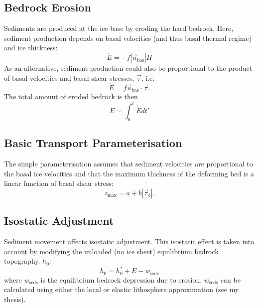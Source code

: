 \subsection{Bedrock Erosion}\label{erosion.sec.hb}
Sediments are produced at the ice base by eroding the hard bedrock. Here, sediment production depends on basal velocities (and thus basal thermal regime) and ice thickness:
\begin{equation}
  \dot{E} = -f|\vec{u}_{\text{bas}}|H
\end{equation}
As an alternative, sediment production could also be proportional to the product of basal velocities and basal shear stresses, $\vec{\tau}$, i.e.
\begin{equation}
  \dot{E} = f\vec{u}_{\text{bas}}\cdot\vec{\tau}.
\end{equation}
The total amount of eroded bedrock is then
\begin{equation}
  E=\int_{0}^t\dot{E}dt'
\end{equation}

\subsection{Basic Transport Parameterisation}\label{erosion.sec.basic_trans}
The simple parameterisation assumes that sediment velocities are proportional to the basal ice velocities and that the maximum thickness of the deforming bed is a linear function of basal shear stress:
\begin{equation}
  z_{\text{max}} = a+b|\vec{\tau}_b|.
\end{equation}



\subsection{Isostatic Adjustment}
Sediment movement affects isostatic adjustment. This isostatic effect is taken into account by modifying the unloaded (no ice sheet) equilibrium bedrock topography. $h_0$:
\begin{equation}
  h_0=h_0^\ast+E-w_{\text{seds}}
\end{equation}
where $w_{\text{seds}}$ is the equilibrium bedrock depression due to erosion. $w_{\text{seds}}$ can be calculated using either the local or elastic lithosphere approximation (see my thesis).
